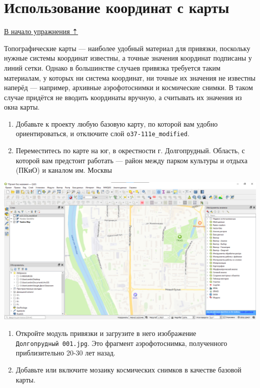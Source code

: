 \documentclass[
  12pt,
]{book}
\begin{document}
\hypertarget{raster-reference-frommap}{%
\section{Использование координат с карты}\label{raster-reference-frommap}}

\protect\hyperlink{raster-reference}{В начало упражнения ⇡}

Топографические карты --- наиболее удобный материал для привязки, поскольку нужные системы координат известны, а точные значения координат подписаны у линий сетки. Однако в большинстве случаев привязка требуется таким материалам, у которых ни система координат, ни точные их значения не известны наперёд --- например, архивные аэрофотоснимки и космические снимки. В таком случае придётся не вводить координаты вручную, а считывать их значения из окна карты.

\begin{enumerate}
\def\labelenumi{\arabic{enumi}.}
\item
  Добавьте к проекту любую базовую карту, по которой вам удобно ориентироваться, и отключите слой \texttt{o37-111e\_modified}.
\item
  Переместитесь по карте на юг, в окрестности г. Долгопрудный. Область, с которой вам предстоит работать --- район между парком культуры и отдыха (ПКиО) и каналом им. Москвы
\end{enumerate}

\includegraphics{images/Ex05_Reference/RasterReference5.png}

\begin{enumerate}
\def\labelenumi{\arabic{enumi}.}
\setcounter{enumi}{2}
\item
  Откройте модуль привязки и загрузите в него изображение \texttt{Долгопрудный\ 001.jpg}. Это фрагмент аэрофотоснимка, полученного приблизительно 20-30 лет назад.
\item
  Добавьте или включите мозаику космических снимков в качестве базовой карты.
\end{enumerate}
\end{document}
